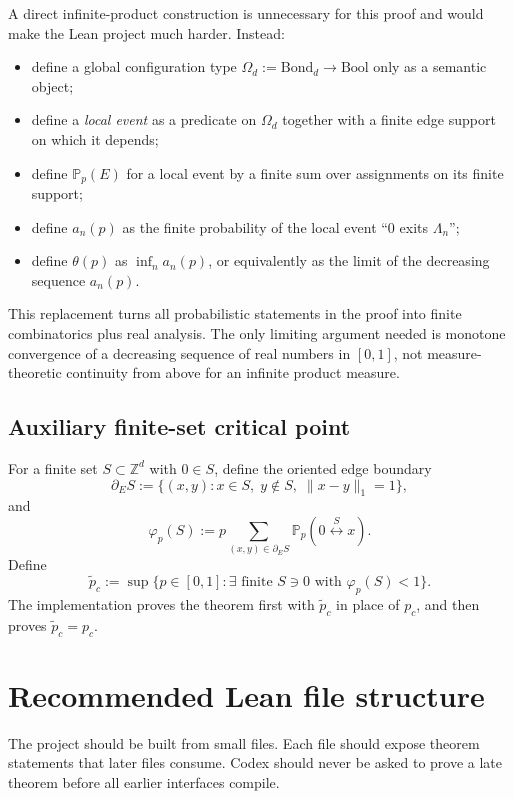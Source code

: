 \documentclass[11pt]{article}
\newcommand{\Z}{\mathbb Z}
\newcommand{\PP}{\mathbb P}
\newcommand{\conn}{\longleftrightarrow}
\newcommand{\pcrit}{p_c}
\newcommand{\ptilde}{\widetilde p_c}
\newcommand{\Lam}{\Lambda}
\newcommand{\dE}{\partial_E}
\theoremstyle{definition}
\theoremstyle{plain}
\begin{document}
A direct infinite-product construction is unnecessary for this proof and would make the Lean project much harder.  Instead:
\begin{itemize}[leftmargin=1.4em]
  \item define a global configuration type $\Omega_d := \mathrm{Bond}_d\to\mathrm{Bool}$ only as a semantic object;
  \item define a \emph{local event} as a predicate on $\Omega_d$ together with a finite edge support on which it depends;
  \item define $\PP_p(E)$ for a local event by a finite sum over assignments on its finite support;
  \item define $a_n(p)$ as the finite probability of the local event ``$0$ exits $\Lam_n$'';
  \item define $\theta(p)$ as $\inf_n a_n(p)$, or equivalently as the limit of the decreasing sequence $a_n(p)$.
\end{itemize}
This replacement turns all probabilistic statements in the proof into finite combinatorics plus real analysis.  The only limiting argument needed is monotone convergence of a decreasing sequence of real numbers in $[0,1]$, not measure-theoretic continuity from above for an infinite product measure.

\subsection{Auxiliary finite-set critical point}

For a finite set $S\subset\Z^d$ with $0\in S$, define the oriented edge boundary
\[
  \dE S := \{(x,y): x\in S,\; y\notin S,
        \; \|x-y\|_1=1\},
\]
and
\[
  \varphi_p(S)
  := p\sum_{(x,y)\in\dE S} \PP_p(0\stackrel{S}{\conn}x).
\]
Define
\[
  \ptilde := \sup\{p\in[0,1]:
       \exists \text{ finite }S\ni0\text{ with }\varphi_p(S)<1\}.
\]
The implementation proves the theorem first with $\ptilde$ in place of $\pcrit$, and then proves $\ptilde=\pcrit$.

\section{Recommended Lean file structure}

The project should be built from small files.  Each file should expose theorem statements that later files consume.  Codex should never be asked to prove a late theorem before all earlier interfaces compile.
\end{document}

